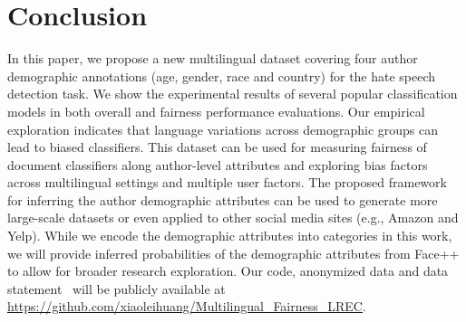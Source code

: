 





\section{Conclusion}
In this paper, we propose a new multilingual dataset covering four author demographic annotations (age, gender, race and country) for the hate speech detection task.
We show the experimental results of several popular classification models in both overall and fairness performance evaluations. 
Our empirical exploration indicates that language variations across demographic groups can lead to biased classifiers.
This dataset can be used for measuring fairness of document classifiers along author-level attributes and exploring bias factors across multilingual settings and multiple user factors.
The proposed framework for inferring the author demographic attributes can be used to generate more large-scale datasets or even applied to other social media sites (e.g., Amazon and Yelp).
While we encode the demographic attributes into categories in this work, 
we will provide inferred probabilities of the demographic attributes from Face++ to allow for broader research exploration.
Our code, anonymized data and data statement~\cite{bender2018data} will be publicly available at \url{https://github.com/xiaoleihuang/Multilingual_Fairness_LREC}.



